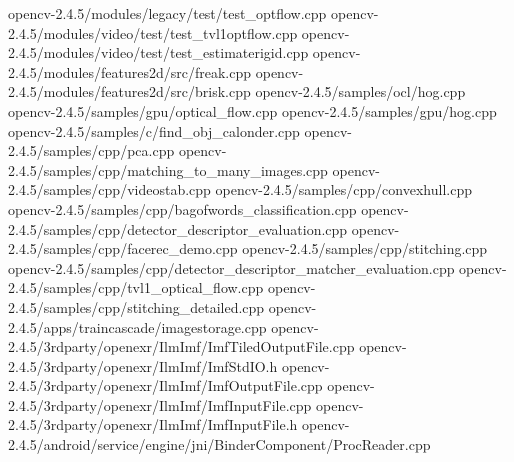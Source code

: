 \documentclass[10pt,a4paper]{article}
\begin{document}
opencv-2.4.5/modules/legacy/test/test\_optflow.cpp \newline
opencv-2.4.5/modules/video/test/test\_tvl1optflow.cpp \newline
opencv-2.4.5/modules/video/test/test\_estimaterigid.cpp \newline
opencv-2.4.5/modules/features2d/src/freak.cpp \newline
opencv-2.4.5/modules/features2d/src/brisk.cpp \newline
opencv-2.4.5/samples/ocl/hog.cpp \newline
opencv-2.4.5/samples/gpu/optical\_flow.cpp \newline
opencv-2.4.5/samples/gpu/hog.cpp \newline
opencv-2.4.5/samples/c/find\_obj\_calonder.cpp \newline
opencv-2.4.5/samples/cpp/pca.cpp \newline
opencv-2.4.5/samples/cpp/matching\_to\_many\_images.cpp \newline
opencv-2.4.5/samples/cpp/videostab.cpp \newline
opencv-2.4.5/samples/cpp/convexhull.cpp \newline
opencv-2.4.5/samples/cpp/bagofwords\_classification.cpp \newline
opencv-2.4.5/samples/cpp/detector\_descriptor\_evaluation.cpp \newline
opencv-2.4.5/samples/cpp/facerec\_demo.cpp \newline
opencv-2.4.5/samples/cpp/stitching.cpp \newline
opencv-2.4.5/samples/cpp/detector\_descriptor\_matcher\_evaluation.cpp \newline
opencv-2.4.5/samples/cpp/tvl1\_optical\_flow.cpp \newline
opencv-2.4.5/samples/cpp/stitching\_detailed.cpp \newline
opencv-2.4.5/apps/traincascade/imagestorage.cpp \newline
opencv-2.4.5/3rdparty/openexr/IlmImf/ImfTiledOutputFile.cpp \newline
opencv-2.4.5/3rdparty/openexr/IlmImf/ImfStdIO.h \newline
opencv-2.4.5/3rdparty/openexr/IlmImf/ImfOutputFile.cpp \newline
opencv-2.4.5/3rdparty/openexr/IlmImf/ImfInputFile.cpp \newline
opencv-2.4.5/3rdparty/openexr/IlmImf/ImfInputFile.h \newline
opencv-2.4.5/android/service/engine/jni/BinderComponent/ProcReader.cpp \\
\end{document}
